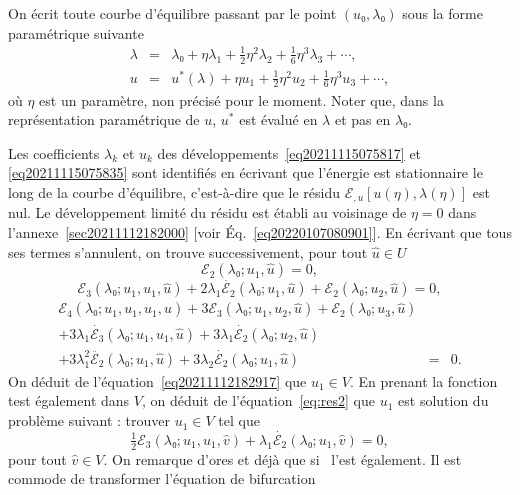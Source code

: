 \documentclass{article}
\begin{document}
On écrit toute courbe d'équilibre passant par le point $(u₀,
λ₀)$ sous la forme paramétrique suivante
\begin{eqnarray}
  λ & = & λ₀ + η λ_1 + \tfrac{1}{2} η^2 λ_2 +
  \tfrac{1}{6} η^3 λ_3 + \cdots,  \label{eq20211115075817}\\
  u & = & u^{\ast} (λ) + η u_1 + \tfrac{1}{2} η^2 u_2 +
  \tfrac{1}{6} η^3 u_3 + \cdots,  \label{eq20211115075835}
\end{eqnarray}
où $η$ est un paramètre, non précisé pour le moment. Noter
que, dans la représentation paramétrique de $u$, $u^{\ast}$ est
évalué en $λ$ et pas en $λ₀$.

Les coefficients $λ_k$ et $u_k$ des
développements~\eqref{eq20211115075817} et \eqref{eq20211115075835} sont
identifiés en écrivant que l'énergie est stationnaire le long de
la courbe d'équilibre, c'est-à-dire que le résidu $ℰ_{,
u}  [u (η), λ (η)]$ est nul. Le développement limité du
résidu est établi au voisinage de $η = 0$ dans
l'annexe~\ref{sec20211112182000} [voir Éq.~\eqref{eq20220107080901}]. En
écrivant que tous ses termes s'annulent, on trouve successivement, pour
tout $\hat{u}∈U$
\begin{equation}
  \label{eq20211112182917} ℰ_2 (λ₀ ; u_1, \hat{u}) = 0,
\end{equation}
\begin{equation}
  \label{eq:res2} ℰ_3 (λ₀ ; u_1, u_1, \hat{u}) + 2 λ_1
  \dot{ℰ_2} (λ₀ ; u_1, \hat{u}) +ℰ_2 (λ₀ ;
  u_2, \hat{u}) = 0,
\end{equation}
\begin{eqnarray}
  ℰ_4 (λ₀ ; u_1, u_1, u_1, \hat{u}) + 3ℰ_3
  (λ₀ ; u_1, u_2, \hat{u}) +ℰ_2 (λ₀ ; u_3, \hat{u}) &
  &  \nonumber\\
  + 3 λ_1  \dot{ℰ_3} (λ₀ ; u_1, u_1, \hat{u}) + 3
  λ_1  \dot{ℰ_2} (λ₀ ; u_2, \hat{u}) &  &  \nonumber\\
  + 3 λ_1^2  \ddot{ℰ_2} (λ₀ ; u_1, \hat{u}) + 3
  λ_2  \dot{ℰ_2} (λ₀ ; u_1, \hat{u}) & = & 0.
  \label{eq:res3}
\end{eqnarray}
On déduit de l'équation~\eqref{eq20211112182917} que $u_1∈V$. En
prenant la fonction test également dans $V$, on déduit de
l'équation~\eqref{eq:res2} que $u_1$ est solution du problème suivant
: trouver $u_1∈V$ tel que
\begin{equation}
  \label{eq:bifurcation 1a} \tfrac{1}{2} ℰ_3 (λ₀ ; u_1, u_1,
  \hat{v}) + λ_1  \dot{ℰ_2} (λ₀ ; u_1, \hat{v}) = 0,
\end{equation}
pour tout $\hat{v}∈V$. On remarque d'ores et déjà que si \ l'est
également. Il est commode de transformer l'équation de bifurcation
\end{document}
